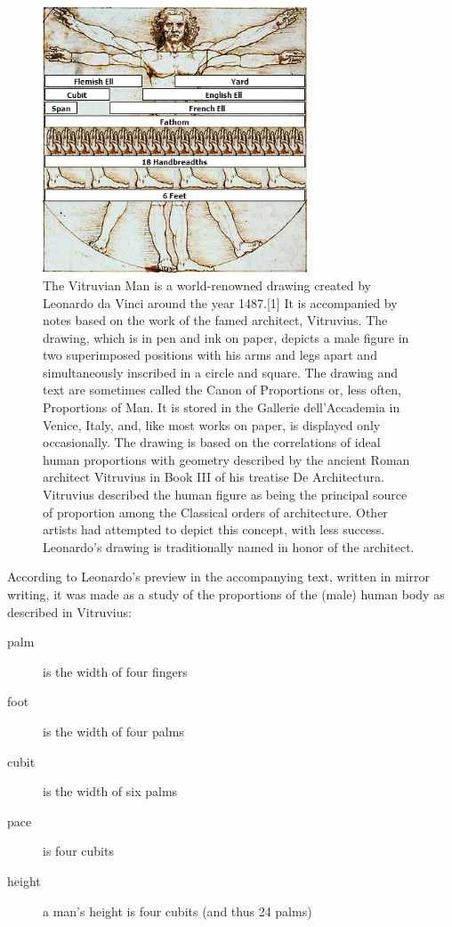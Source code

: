 \documentclass{tufte-book}
\begin{document}
\begin{figure}[htbp]
\centering
\includegraphics[width=0.7\textwidth]{./graphics/vitruvian-man}

\caption{The Vitruvian Man is a world-renowned drawing created by Leonardo da Vinci around the year 1487.[1] It is accompanied by notes based on the work of the famed architect, Vitruvius. The drawing, which is in pen and ink on paper, depicts a male figure in two superimposed positions with his arms and legs apart and simultaneously inscribed in a circle and square. The drawing and text are sometimes called the Canon of Proportions or, less often, Proportions of Man. It is stored in the Gallerie dell'Accademia in Venice, Italy, and, like most works on paper, is displayed only occasionally.
The drawing is based on the correlations of ideal human proportions with geometry described by the ancient Roman architect Vitruvius in Book III of his treatise De Architectura. Vitruvius described the human figure as being the principal source of proportion among the Classical orders of architecture. Other artists had attempted to depict this concept, with less success. Leonardo's drawing is traditionally named in honor of the architect.}

\end{figure}

According to Leonardo's preview in the accompanying text, written in mirror writing, it was made as a study of the proportions of the (male) human body as described in Vitruvius:

\begin{description}
\item [palm] is the width of four fingers

\item [foot] is the width of four palms

\item [cubit] is the width of six palms

\item [pace] is four cubits

\item [height] a man's height is four cubits (and thus 24 palms)
\end{description}
\end{document}
